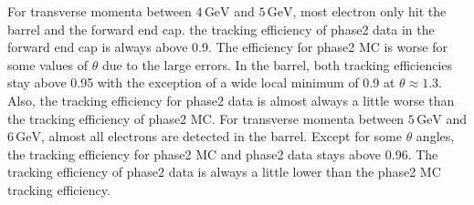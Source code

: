 \documentclass[a4paper,11pt,twosided,final,german,openbib,pdftex,listof=totoc,bibliography=totoc]{scrbook}
\begin{document}
For transverse momenta between $4\,\textrm{GeV}$ and $5\,\textrm{GeV}$, most electron only hit the barrel and the forward end cap. the tracking efficiency of phase2 data in the forward end cap is always above 0.9. The efficiency for phase2 MC is worse for some values of $\theta$ due to the large errors. In the barrel, both tracking efficiencies stay above 0.95 with the exception of a wide local minimum of 0.9 at $\theta \approx 1.3$. Also, the tracking efficiency for phase2 data is almost always a little worse than the tracking efficiency of phase2 MC.
For transverse momenta between $5\,\textrm{GeV}$ and $6\,\textrm{GeV}$, almost all electrons are detected in the barrel. Except for some $\theta$ angles, the tracking efficiency for phase2 MC and phase2 data stays above 0.96. The tracking efficiency of phase2 data is always a little lower than the phase2 MC tracking efficiency. 
\end{document}

